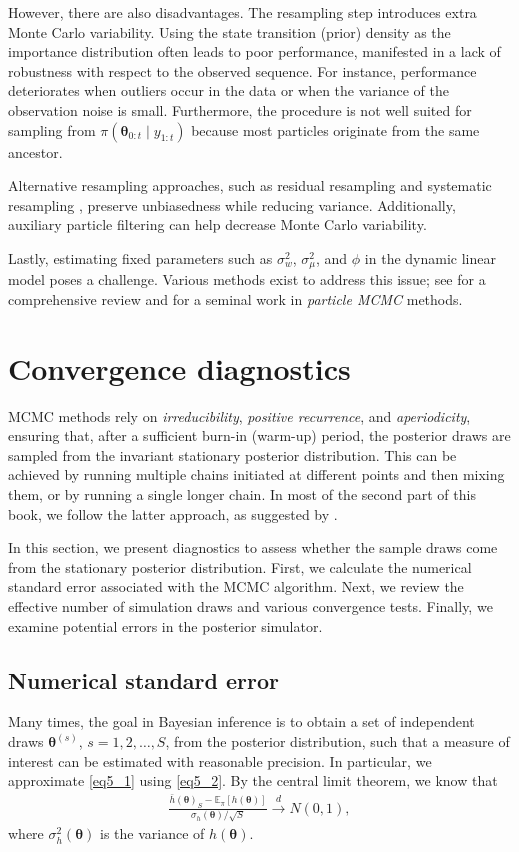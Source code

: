 However, there are also disadvantages. The resampling step introduces extra Monte Carlo variability. Using the state transition (prior) density as the importance distribution often leads to poor performance, manifested in a lack of robustness with respect to the observed sequence. For instance, performance deteriorates when outliers occur in the data or when the variance of the observation noise is small. Furthermore, the procedure is not well suited for sampling from $\pi(\bm{\theta}_{0:t}\mid y_{1:t})$ because most particles originate from the same ancestor.

Alternative resampling approaches, such as residual resampling \cite{Liu1995} and systematic resampling \cite{Carpenter1999}, preserve unbiasedness while reducing variance. Additionally, auxiliary particle filtering \cite{Cappe2007} can help decrease Monte Carlo variability.

Lastly, estimating fixed parameters such as $\sigma_w^2$, $\sigma_{\mu}^2$, and $\phi$ in the dynamic linear model poses a challenge. Various methods exist to address this issue; see \cite{Kantas2009,kantas2015particle} for a comprehensive review and \cite{Andrieu2010} for a seminal work in \textit{particle MCMC} methods.

\section{Convergence diagnostics}\label{sec54}
MCMC methods rely on \textit{irreducibility}, \textit{positive recurrence}, and \textit{aperiodicity}, ensuring that, after a sufficient burn-in (warm-up) period, the posterior draws are sampled from the invariant stationary posterior distribution. This can be achieved by running multiple chains initiated at different points and then mixing them, or by running a single longer chain. In most of the second part of this book, we follow the latter approach, as suggested by \cite{geyer1992practical}. 

In this section, we present diagnostics to assess whether the sample draws come from the stationary posterior distribution. First, we calculate the numerical standard error associated with the MCMC algorithm. Next, we review the effective number of simulation draws and various convergence tests. Finally, we examine potential errors in the posterior simulator.

\subsection{Numerical standard error}
Many times, the goal in Bayesian inference is to obtain a set of independent draws $\bm{\theta}^{(s)}$, $s = 1, 2, \dots, S$, from the posterior distribution, such that a measure of interest can be estimated with reasonable precision. In particular, we approximate \eqref{eq5_1} using \eqref{eq5_2}. By the central limit theorem, we know that
\begin{align}\label{eq_CLT}
	\frac{\bar{h}(\bm{\theta})_S - \mathbb{E}_{\pi}[h(\bm{\theta})]}{\sigma_h(\bm{\theta})/\sqrt{S}} \stackrel{d}{\rightarrow} N(0, 1),
\end{align}
where $\sigma^2_h(\bm{\theta})$ is the variance of $h(\bm{\theta})$.

